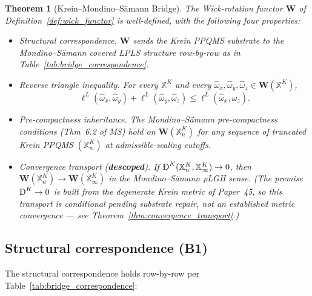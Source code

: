 \documentclass[11pt,a4paper]{article}
\theoremstyle{plain}
\newtheorem{theorem}{Theorem}[section]
\theoremstyle{definition}
\newcommand{\BigDeth}{\text{\DJ}^{K}}
\newcommand{\Wfun}{\mathbf{W}}
\begin{document}
\begin{theorem}[Krein--Mondino--S\"amann
Bridge]\label{thm:bridge}
The Wick-rotation functor $\Wfun$ of Definition~\ref{def:wick_functor}
is well-defined, with the following four properties:
\begin{itemize}
\item[\textbf{(B1)}] \emph{Structural correspondence.} $\Wfun$ sends
the Krein PPQMS substrate to the Mondino--S\"amann covered LPLS
structure row-by-row as in Table~\ref{tab:bridge_correspondence}.
\item[\textbf{(B2)}] \emph{Reverse triangle inequality.} For every
$\mathbb{X}^{K}$ and every $\hat{\omega}_{x}, \hat{\omega}_{y},
\hat{\omega}_{z} \in \Wfun(\mathbb{X}^{K})$,
\[
\ell^{L}(\hat{\omega}_{x}, \hat{\omega}_{y}) +
\ell^{L}(\hat{\omega}_{y}, \hat{\omega}_{z}) \le
\ell^{L}(\hat{\omega}_{x}, \hat{\omega}_{z}).
\]
\item[\textbf{(B3)}] \emph{Pre-compactness inheritance.} The
Mondino--S\"amann pre-compactness conditions (Thm~6.2 of MS) hold on
$\Wfun(\mathbb{X}^{K}_{n})$ for any sequence of truncated Krein PPQMS
$(\mathbb{X}^{K}_{n})$ at admissible-scaling cutoffs.
\item[\textbf{(B4)}] \emph{Convergence transport} (\textbf{descoped}). If
$\BigDeth(\mathbb{X}^{K}_{n}, \mathbb{X}^{K}_{\infty}) \to 0$, then
$\Wfun(\mathbb{X}^{K}_{n}) \to \Wfun(\mathbb{X}^{K}_{\infty})$ in the
Mondino--S\"amann pLGH sense. \emph{(The premise $\BigDeth\to0$ is built
from the degenerate Krein metric of Paper~45, so this transport is
conditional pending substrate repair, not an established metric
convergence --- see Theorem~\ref{thm:convergence_transport}.)}
\end{itemize}
\end{theorem}

\subsection{Structural correspondence (B1)}\label{sec:b1_correspondence}

The structural correspondence holds row-by-row per
Table~\ref{tab:bridge_correspondence}:
\end{document}
